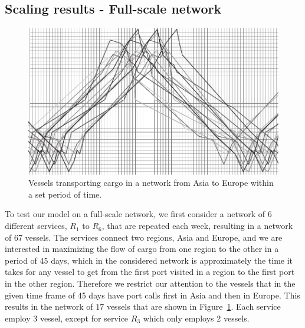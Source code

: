 \subsection{Scaling results - Full-scale network}
\begin{figure}
	\centering
		\includegraphics{figures/fewerBW.pdf}
	\caption{Vessels transporting cargo in a network from Asia to Europe within a set period of time.}
	\label{fig:full}
\end{figure}

\noindent To test our model on a full-scale network, we first consider a network of 6 different services, $R_1$ to $R_6$, that are repeated each week, resulting in a network of 67 vessels. The services connect two regions, Asia and Europe, and we are interested in maximizing the flow of cargo from one region to the other in a period of 45 days, which in the considered network is approximately the time it takes for any vessel to get from the first port visited in a region to the first port in the other region. Therefore we restrict our attention to the vessels that in the given time frame of 45 days have port calls first in Asia and then in Europe. This results in the network of $17$ vessels that are shown in Figure~\ref{fig:full}. Each service employ 3 vessel, except for service $R_3$ which only employs 2 vessels.

